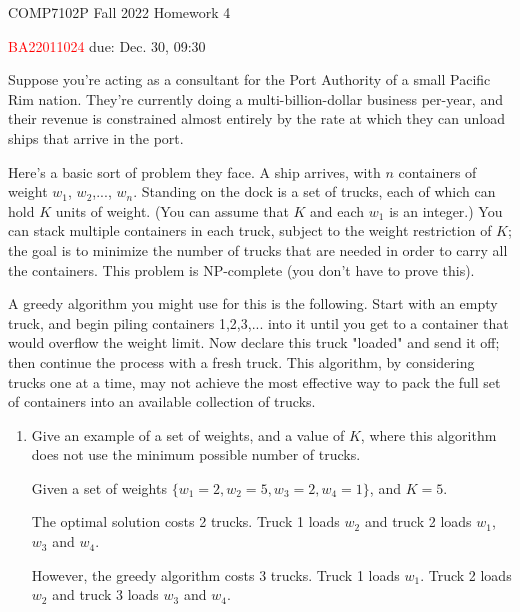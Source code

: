 



\noindent
\hspace*{.2in} COMP7102P Fall 2022
\hfill Homework 4\\
\begin{CJK}{UTF8}{gbsn}
    \hspace*{.2in} \textcolor{red}{BA22011024 \Name{} \ChineseName} \hfill due: Dec. 30, 09:30 
\end{CJK}
\bigskip

\begin{problem}
  Suppose you're acting as a consultant for the Port Authority of a small Pacific Rim nation. They're currently doing a multi-billion-dollar business per-year, and their revenue is constrained almost entirely by the rate at which they can unload ships that arrive in the port. 
  
  Here's a basic sort of problem they face. A ship arrives, with $n$ containers of weight $w_1$, $w_2$,..., $w_n$. Standing on the dock is a set of trucks, each of which can hold $K$ units of weight. (You can assume that $K$ and each $w_1$ is an integer.) You can stack multiple containers in each truck, subject to the weight restriction of $K$; the goal is to minimize the number of trucks that are needed in order to carry all the containers. This problem is NP-complete (you don't have to prove this).
  
  A greedy algorithm you might use for this is the following. Start with an empty truck, and begin piling containers 1,2,3,... into it until you get to a container that would overflow the weight limit. Now declare this truck "loaded" and send it off; then continue the process with a fresh truck. This algorithm, by considering trucks one at a time, may not achieve the most effective way to pack the full set of containers into an available collection of trucks.
  
  \begin{enumerate}
    \item Give an example of a set of weights, and a value of $K$, where this algorithm does not use the minimum possible number of trucks.
    
    \Answer Given a set of weights $\{w_1 = 2, w_2 = 5,w_3=2, w_4 =1\}$, and $K=5$. 
    
    The optimal solution costs 2 trucks. Truck 1 loads $w_2$ and truck 2 loads $w_1$, $w_3$ and $w_4$. 
    
    However, the greedy algorithm costs 3 trucks. Truck 1 loads $w_1$. Truck 2 loads $w_2$ and truck 3 loads $w_3$ and $w_4$.
    

\end{enumerate}
\end{problem}
